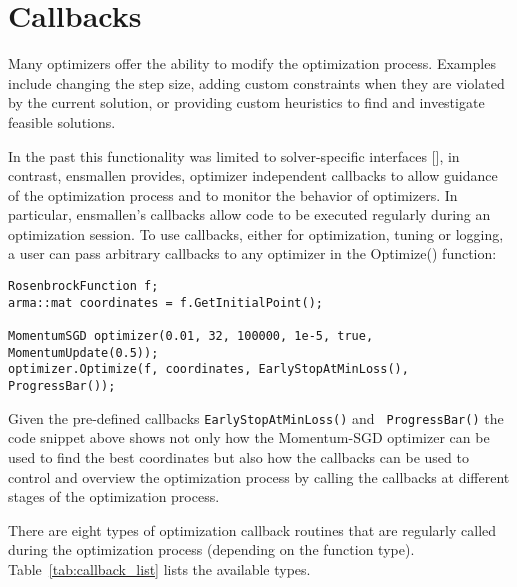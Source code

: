 \section{Callbacks}
\label{sec:callbacks}

Many optimizers offer the ability to modify the optimization process. Examples
include changing the step size, adding custom constraints when they are violated
by the current solution, or providing custom heuristics to find and investigate
feasible solutions.

In the past this functionality was limited to solver-specific interfaces [], in
contrast, ensmallen provides, optimizer independent callbacks to allow guidance
of the optimization process and to monitor the behavior of optimizers. In
particular, ensmallen's callbacks allow code to be executed regularly during an
optimization session. To use callbacks, either for optimization, tuning or
logging, a user can pass arbitrary callbacks to any optimizer in the Optimize()
function:

\begin{verbatim}
RosenbrockFunction f;
arma::mat coordinates = f.GetInitialPoint();

MomentumSGD optimizer(0.01, 32, 100000, 1e-5, true, MomentumUpdate(0.5));
optimizer.Optimize(f, coordinates, EarlyStopAtMinLoss(), ProgressBar());
\end{verbatim}

Given the pre-defined callbacks {\tt EarlyStopAtMinLoss()} and {\tt
ProgressBar()} the code snippet above shows not only how the Momentum-SGD
optimizer can be used to find the best coordinates but also how the callbacks
can be used to control and overview the optimization process by calling the
callbacks at different stages of the optimization process.

There are eight types of optimization callback routines that are regularly
called during the optimization process (depending on the function type).
Table~\ref{tab:callback_list} lists the available types.

